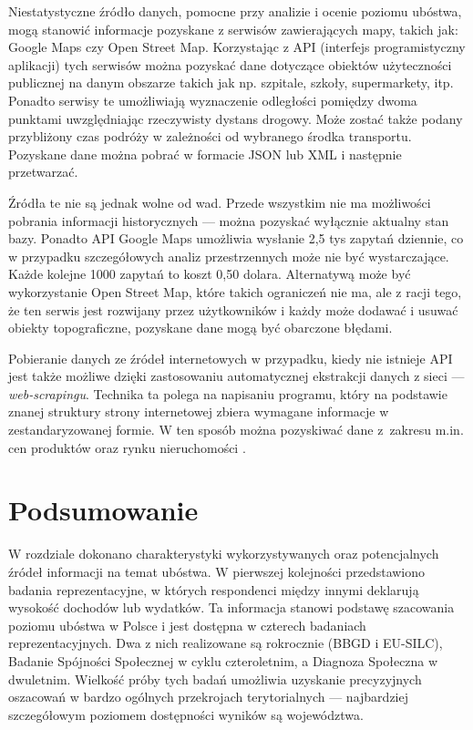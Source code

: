 Niestatystyczne źródło danych, pomocne przy analizie i ocenie poziomu ubóstwa, mogą stanowić informacje pozyskane z serwisów zawierających mapy, takich jak: Google Maps czy Open Street Map. Korzystając z API (interfejs programistyczny aplikacji) tych serwisów można pozyskać dane dotyczące obiektów użyteczności publicznej na danym obszarze takich jak np. szpitale, szkoły, supermarkety, itp. Ponadto serwisy te umożliwiają wyznaczenie odległości pomiędzy dwoma punktami uwzględniając rzeczywisty dystans drogowy. Może zostać także podany przybliżony czas podróży w zależności od wybranego środka transportu. Pozyskane dane można pobrać w formacie JSON lub XML i następnie przetwarzać. 

Źródła te nie są jednak wolne od wad. Przede wszystkim nie ma możliwości pobrania informacji historycznych --- można pozyskać wyłącznie aktualny stan bazy. Ponadto API Google Maps umożliwia wysłanie 2,5 tys zapytań dziennie, co w przypadku szczegółowych analiz przestrzennych może nie być wystarczające. Każde kolejne 1000 zapytań to koszt 0,50 dolara. Alternatywą może być wykorzystanie Open Street Map, które takich ograniczeń nie ma, ale z racji tego, że ten serwis jest rozwijany przez użytkowników i każdy może dodawać i usuwać obiekty topograficzne, pozyskane dane mogą być obarczone błędami.

Pobieranie danych ze źródeł internetowych w przypadku, kiedy nie istnieje API jest także możliwe dzięki zastosowaniu automatycznej ekstrakcji danych z sieci --- \textit{web-scrapingu}. Technika ta polega na napisaniu programu, który na podstawie znanej struktury strony internetowej zbiera wymagane informacje w zestandaryzowanej formie. W ten sposób można pozyskiwać dane z~zakresu m.in. cen produktów oraz rynku nieruchomości \citep{beresewicz2015}.

\section{Podsumowanie}

W rozdziale dokonano charakterystyki wykorzystywanych oraz potencjalnych źródeł informacji na temat ubóstwa. W pierwszej kolejności przedstawiono badania reprezentacyjne, w których respondenci między innymi deklarują wysokość dochodów lub wydatków. Ta informacja stanowi podstawę szacowania poziomu ubóstwa w Polsce i jest dostępna w czterech badaniach reprezentacyjnych. Dwa z nich realizowane są rokrocznie (BBGD i EU-SILC), Badanie Spójności Społecznej w cyklu czteroletnim, a Diagnoza Społeczna w dwuletnim. Wielkość próby tych badań umożliwia uzyskanie precyzyjnych oszacowań w bardzo ogólnych przekrojach terytorialnych --- najbardziej szczegółowym poziomem dostępności wyników są województwa.

